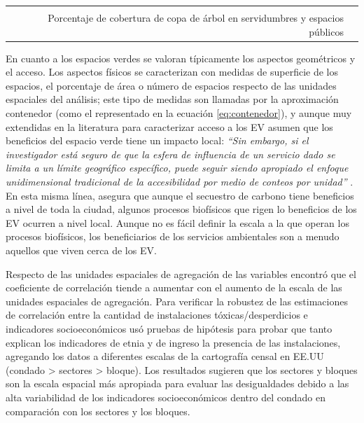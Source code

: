\documentclass[12pt,]{book}
\begin{document}
\begin{longtable}[]{@{}rr@{}}
\begin{minipage}[t]{0.31\columnwidth}
\citep{zhou_social_2013}\strut
\end{minipage}\tabularnewline
\begin{minipage}[t]{0.57\columnwidth}\raggedleft\strut
Porcentaje de cobertura de copa de árbol en servidumbres y espacios
públicos\strut
\end{minipage} & \begin{minipage}[t]{0.31\columnwidth}\raggedleft\strut
\citep{landry_street_2009}\strut
\end{minipage}\tabularnewline
\bottomrule
\end{longtable}

En cuanto a los espacios verdes se valoran típicamente los aspectos
geométricos y el acceso. Los aspectos físicos se caracterizan con
medidas de superficie de los espacios, el porcentaje de área o número de
espacios respecto de las unidades espaciales del análisis; este tipo de
medidas son llamadas por \citep{talen_assessing_1998} la aproximación
contenedor (como el representado en la ecuación \eqref{eq:contenedor}), y
aunque muy extendidas en la literatura para caracterizar acceso a los EV
asumen que los beneficios del espacio verde tiene un impacto local:
\emph{``Sin embargo, si el investigador está seguro de que la esfera de
influencia de un servicio dado se limita a un límite geográfico
específico, puede seguir siendo apropiado el enfoque unidimensional
tradicional de la accesibilidad por medio de conteos por unidad''}
\citep{talen_assessing_1998}. En esta misma línea,
\citep{kabisch_green_2014} asegura que aunque el secuestro de carbono
tiene beneficios a nivel de toda la ciudad, algunos procesos biofísicos
que rigen lo beneficios de los EV ocurren a nivel local. Aunque no es
fácil definir la escala a la que operan los procesos biofísicos, los
beneficiarios de los servicios ambientales son a menudo aquellos que
viven cerca de los EV.

Respecto de las unidades espaciales de agregación de las variables
\citep{cutter_role_1996} encontró que el coeficiente de correlación
tiende a aumentar con el aumento de la escala de las unidades espaciales
de agregación. Para verificar la robustez de las estimaciones de
correlación entre la cantidad de instalaciones tóxicas/desperdicios e
indicadores socioeconómicos \citet{cutter_role_1996} usó pruebas de
hipótesis para probar que tanto explican los indicadores de etnia y de
ingreso la presencia de las instalaciones, agregando los datos a
diferentes escalas de la cartografía censal en EE.UU (condado
\textgreater{} sectores \textgreater{} bloque). Los resultados sugieren
que los sectores y bloques son la escala espacial más apropiada para
evaluar las desigualdades debido a las alta variabilidad de los
indicadores socioeconómicos dentro del condado en comparación con los
sectores y los bloques.
\end{document}
